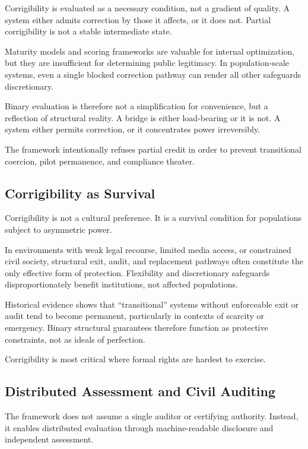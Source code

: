 \documentclass[11pt,a4paper]{article}
\begin{document}
Corrigibility is evaluated as a necessary condition, not a gradient of quality. A system either admits correction by those it affects, or it does not. Partial corrigibility is not a stable intermediate state.

Maturity models and scoring frameworks are valuable for internal optimization, but they are insufficient for determining public legitimacy. In population-scale systems, even a single blocked correction pathway can render all other safeguards discretionary.

Binary evaluation is therefore not a simplification for convenience, but a reflection of structural reality. A bridge is either load-bearing or it is not. A system either permits correction, or it concentrates power irreversibly.

The framework intentionally refuses partial credit in order to prevent transitional coercion, pilot permanence, and compliance theater.

\subsection{Corrigibility as Survival}

Corrigibility is not a cultural preference. It is a survival condition for populations subject to asymmetric power.

In environments with weak legal recourse, limited media access, or constrained civil society, structural exit, audit, and replacement pathways often constitute the only effective form of protection. Flexibility and discretionary safeguards disproportionately benefit institutions, not affected populations.

Historical evidence shows that ``transitional'' systems without enforceable exit or audit tend to become permanent, particularly in contexts of scarcity or emergency. Binary structural guarantees therefore function as protective constraints, not as ideals of perfection.

Corrigibility is most critical where formal rights are hardest to exercise.

\subsection{Distributed Assessment and Civil Auditing}

The framework does not assume a single auditor or certifying authority. Instead, it enables distributed evaluation through machine-readable disclosure and independent assessment.
\end{document}

